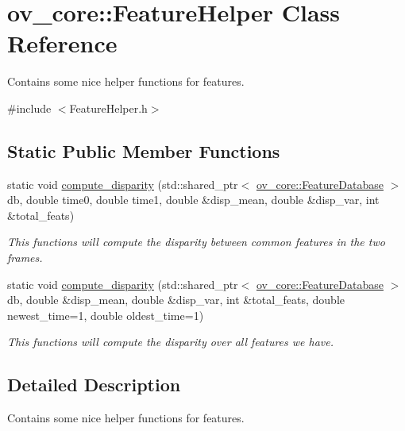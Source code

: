 \hypertarget{classov__core_1_1FeatureHelper}{}\section{ov\+\_\+core\+:\+:Feature\+Helper Class Reference}
\label{classov__core_1_1FeatureHelper}


Contains some nice helper functions for features.  




{\ttfamily \#include $<$Feature\+Helper.\+h$>$}

\subsection*{Static Public Member Functions}
\begin{DoxyCompactItemize}
\item 
static void \hyperlink{classov__core_1_1FeatureHelper_a1371c7d11c6d74693f7cec9deea2afcd}{compute\+\_\+disparity} (std\+::shared\+\_\+ptr$<$ \hyperlink{classov__core_1_1FeatureDatabase}{ov\+\_\+core\+::\+Feature\+Database} $>$ db, double time0, double time1, double \&disp\+\_\+mean, double \&disp\+\_\+var, int \&total\+\_\+feats)
\begin{DoxyCompactList}\small\item\em This functions will compute the disparity between common features in the two frames. \end{DoxyCompactList}\item 
static void \hyperlink{classov__core_1_1FeatureHelper_aef3bc04d256c42e04fce2a62e30c3ef0}{compute\+\_\+disparity} (std\+::shared\+\_\+ptr$<$ \hyperlink{classov__core_1_1FeatureDatabase}{ov\+\_\+core\+::\+Feature\+Database} $>$ db, double \&disp\+\_\+mean, double \&disp\+\_\+var, int \&total\+\_\+feats, double newest\+\_\+time=1, double oldest\+\_\+time=1)
\begin{DoxyCompactList}\small\item\em This functions will compute the disparity over all features we have. \end{DoxyCompactList}\end{DoxyCompactItemize}


\subsection{Detailed Description}
Contains some nice helper functions for features. 

